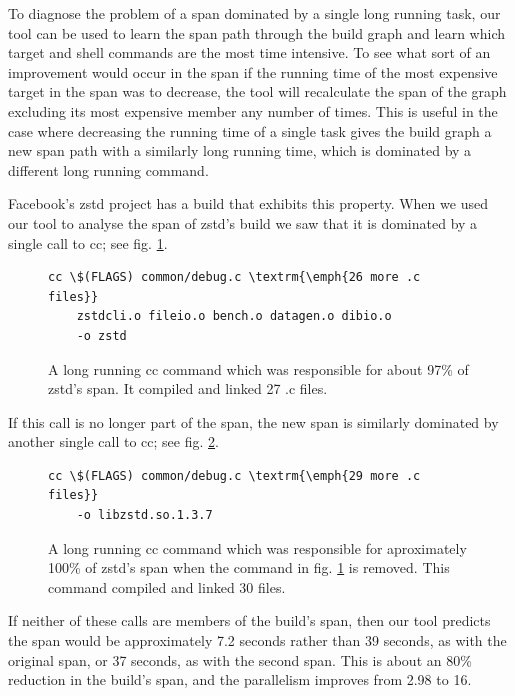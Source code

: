 \documentclass[sigconf,10pt,authorversion]{acmart}\settopmatter{printfolios=true,printccs=false,printacmref=false}
\begin{document}
To diagnose the problem of a span dominated by a single long running task, our tool can be used
to learn the span path through the build graph and learn which target and shell commands
are the most time intensive.  To see what sort of an improvement would occur in the span if the
running time of the most expensive target in the span was to decrease, the tool will recalculate
the span of the graph excluding its most expensive member any number of times.  This is useful
in the case where decreasing the running time of a single task gives the build graph a new span
path with a similarly long running time, which is dominated by a different long running command.

Facebook's zstd project \cite{zstd1.3.7} has a build that exhibits this property.  When we used our tool to analyse
the span of zstd's build we saw that it is dominated by a single call to cc; see fig. \ref{code:cc1}.

\begin{figure}[H]
\begin{Verbatim}[commandchars=\\\{\},codes={\catcode`$=3\catcode`^=7\catcode`_=8},fontsize=\small]
  cc \$(FLAGS) common/debug.c \textrm{\emph{26 more .c files}}
    zstdcli.o fileio.o bench.o datagen.o dibio.o
    -o zstd
\end{Verbatim}
\caption{A long running cc command which was responsible for about 97\% of zstd's span.  It compiled and linked 27 .c files.}
\label{code:cc1}
\end{figure}

If this call is no longer part of the span, the new span is similarly dominated by another single call to cc;
see fig. \ref{code:cc2}.
\begin{figure}[H]
\begin{Verbatim}[commandchars=\\\{\},codes={\catcode`$=3\catcode`^=7\catcode`_=8},fontsize=\small]
  cc \$(FLAGS) common/debug.c \textrm{\emph{29 more .c files}}
    -o libzstd.so.1.3.7
\end{Verbatim}
\caption{A long running cc command which was responsible for aproximately 100\% of zstd's span when the command in fig. \ref{code:cc1} is removed.
This command compiled and linked 30 files.}
\label{code:cc2}
\end{figure}
If neither of these calls are members of the build's span, then our tool predicts the span would be
approximately 7.2 seconds rather than 39 seconds, as with the original span, or 37 seconds, as with the second span.
This is about an 80\% reduction in the build's span, and the parallelism improves from 2.98 to 16.
\end{document}

